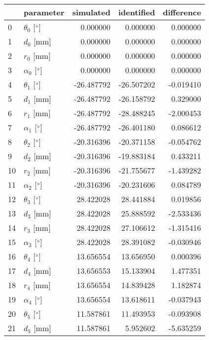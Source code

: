 \documentclass{standalone}%
\begin{document}
%
\normalsize%
\begin{tabular}{llrrr}
\toprule
{} &                 parameter &  simulated & identified & difference \\
\midrule
0  &  $\theta_{0}$ [$\degree$] &   0.000000 &   0.000000 &   0.000000 \\
1  &              $d_{0}$ [mm] &   0.000000 &   0.000000 &   0.000000 \\
2  &              $r_{0}$ [mm] &   0.000000 &   0.000000 &   0.000000 \\
3  &  $\alpha_{0}$ [$\degree$] &   0.000000 &   0.000000 &   0.000000 \\
4  &  $\theta_{1}$ [$\degree$] & -26.487792 & -26.507202 &  -0.019410 \\
5  &              $d_{1}$ [mm] & -26.487792 & -26.158792 &   0.329000 \\
6  &              $r_{1}$ [mm] & -26.487792 & -28.488245 &  -2.000453 \\
7  &  $\alpha_{1}$ [$\degree$] & -26.487792 & -26.401180 &   0.086612 \\
8  &  $\theta_{2}$ [$\degree$] & -20.316396 & -20.371158 &  -0.054762 \\
9  &              $d_{2}$ [mm] & -20.316396 & -19.883184 &   0.433211 \\
10 &              $r_{2}$ [mm] & -20.316396 & -21.755677 &  -1.439282 \\
11 &  $\alpha_{2}$ [$\degree$] & -20.316396 & -20.231606 &   0.084789 \\
12 &  $\theta_{3}$ [$\degree$] &  28.422028 &  28.441884 &   0.019856 \\
13 &              $d_{3}$ [mm] &  28.422028 &  25.888592 &  -2.533436 \\
14 &              $r_{3}$ [mm] &  28.422028 &  27.106612 &  -1.315416 \\
15 &  $\alpha_{3}$ [$\degree$] &  28.422028 &  28.391082 &  -0.030946 \\
16 &  $\theta_{4}$ [$\degree$] &  13.656554 &  13.656950 &   0.000396 \\
17 &              $d_{4}$ [mm] &  13.656553 &  15.133904 &   1.477351 \\
18 &              $r_{4}$ [mm] &  13.656554 &  14.839428 &   1.182874 \\
19 &  $\alpha_{4}$ [$\degree$] &  13.656554 &  13.618611 &  -0.037943 \\
20 &  $\theta_{5}$ [$\degree$] &  11.587861 &  11.493953 &  -0.093908 \\
21 &              $d_{5}$ [mm] &  11.587861 &   5.952602 &  -5.635259 \\

\end{tabular}
\end{document}
